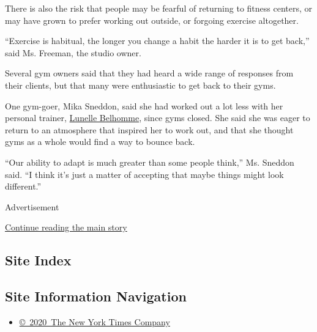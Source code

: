 There is also the risk that people may be fearful of returning to
fitness centers, or may have grown to prefer working out outside, or
forgoing exercise altogether.

``Exercise is habitual, the longer you change a habit the harder it is
to get back,'' said Ms. Freeman, the studio owner.

Several gym owners said that they had heard a wide range of responses
from their clients, but that many were enthusiastic to get back to their
gyms.

One gym-goer, Mika Sneddon, said she had worked out a lot less with her
personal trainer,
\href{https://www.lcbfitnessnyc.com/meetlunelle}{Lunelle Belhomme},
since gyms closed. She said she was eager to return to an atmosphere
that inspired her to work out, and that she thought gyms as a whole
would find a way to bounce back.

``Our ability to adapt is much greater than some people think,'' Ms.
Sneddon said. ``I think it's just a matter of accepting that maybe
things might look different.''

Advertisement

\protect\hyperlink{after-bottom}{Continue reading the main story}

\hypertarget{site-index}{%
\subsection{Site Index}\label{site-index}}

\hypertarget{site-information-navigation}{%
\subsection{Site Information
Navigation}\label{site-information-navigation}}

\begin{itemize}
\tightlist
\item
  \href{https://help.nytimes3xbfgragh.onion/hc/en-us/articles/115014792127-Copyright-notice}{©~2020~The
  New York Times Company}
\end{itemize}

